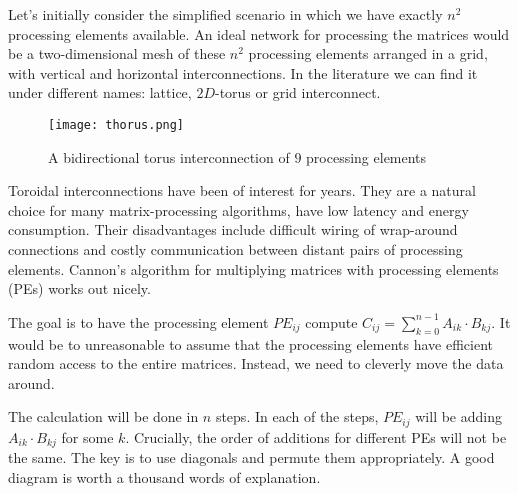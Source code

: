 \documentclass[12pt,a4paper,twoside,openright]{report}
\begin{document}
Let's initially consider the simplified scenario in which we have exactly $n^2$ processing elements available. An ideal network for processing the matrices would be a two-dimensional mesh of these $n^2$ processing elements arranged in a grid, with vertical and horizontal interconnections. In the literature we can find it under different names: lattice, $2D$-torus or grid interconnect. 

\begin{figure}[h]
\centering
\texttt{[image: thorus.png]}
\caption{A bidirectional torus interconnection of $9$ processing elements}
\end{figure}

Toroidal interconnections have been of interest for years. They are a natural choice for many matrix-processing algorithms, have low latency and energy consumption. Their disadvantages include difficult wiring of wrap-around connections and costly communication between distant pairs of processing elements. Cannon's algorithm\cite{cannon} for multiplying matrices with processing elements (PEs) works out nicely.

The goal is to have the processing element $PE_{ij}$ compute $C_{ij}=\sum_{k=0}^{n-1} A_{ik}\cdot B_{kj}$. It would be to unreasonable to assume that the processing elements have efficient random access to the entire matrices. Instead, we need to cleverly move the data around.

The calculation will be done in $n$ steps. In each of the steps, $PE_{ij}$ will be adding $A_{ik}\cdot B_{kj}$ for some $k$. Crucially, the order of additions for different PEs will not be the same. The key is to use diagonals and permute them appropriately. A good diagram is worth a thousand words of explanation. 
\end{document}
